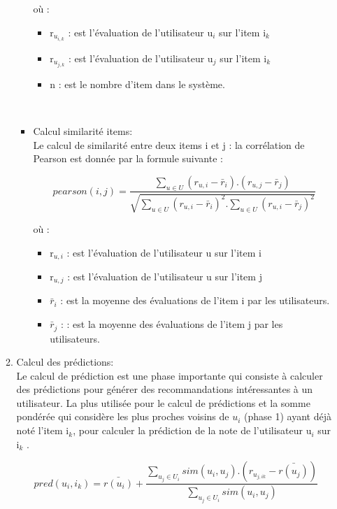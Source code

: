 \documentclass[a4paper,12pt,letterpaper,headsepline,singlespacing,headsepline, french]{report}
\begin{document}
\begin{itemize}
\begin{enumerate}
\begin{itemize}
où :

\begin{itemize}
	\item r$_{u_{i,k}}$  : est l’évaluation de l’utilisateur  u$_{i}$ sur l’item i$_{k}$
	\item r$_{u_{j,k}}$ : est l’évaluation de l’utilisateur  u$_{j}$ sur l’item i$_{k}$
	\item 	n : est le nombre d’item dans le système.
\end{itemize}
\mbox{}\\

\item Calcul similarité items:\\
Le calcul de similarité entre deux items i et j : la corrélation de Pearson est donnée par la formule suivante :

\begin{equation}\label{key3}
pearson(i,j)=\frac{\sum_{u \in U} (r_{u,i}-\bar{r}_{i}).(r_{u,j}-\bar{r}_{j})}{\sqrt{\sum_{u \in U} (r_{u,i}-\bar{r}_{i})^{2}.\sum_{u \in U}(r_{u,i}-\bar{r}_{j})^{2}}}
\end{equation}

où :

\begin{itemize}
	\item r$_{u,i}$  : est l’évaluation de l’utilisateur u sur l’item i 
	\item r$_{u,j}$ : est l’évaluation de l’utilisateur u sur l’item j
	\item $\bar{r}_{i}$ : est la moyenne des évaluations de l’item i par les utilisateurs.
	\item $\bar{r}_{j}$ : : est la moyenne des évaluations de l’item j par les utilisateurs.
\end{itemize}
\end{itemize}

\item Calcul des prédictions:\\
Le calcul de prédiction est une phase importante qui consiste à calculer des prédictions pour générer des recommandations intéressantes à un utilisateur. La plus utilisée pour le calcul de prédictions et la somme pondérée qui considère les plus proches voisins de $u_{i}$ (phase 1) ayant déjà noté l’item i$_{k}$, pour calculer la prédiction de la note de l’utilisateur u$_{i}$ sur i$_{k}$ \cite{ref9}.



\begin{equation}\label{key4}
pred(u_{i},i_{k})=\bar{r(u_{i})} + \frac{\sum_{u_{j} \in U_{i}} sim(u_{i},u_{j}).(r_{u_{j,ik}}-\bar{r(u_{j})})}{\sum_{u_{j} \in U_{i}} sim(u_{i},u_{j})}
\end{equation}


\end{enumerate}
\end{itemize}
\end{document}
